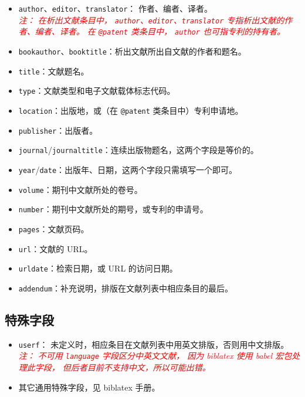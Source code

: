 \documentclass[UTF8, fancyhdr, hyperref]{ctexart}
\newcommand{\myemph}[1]{\emph{\textcolor{red}{#1}}}
\begin{document}
\begin{itemize}
	\item \verb|author|、\verb|editor|、\verb|translator|：
		作者、编者、译者。\\
		\myemph{%
			注：
			在析出文献条目中，
			\texttt{author}、\texttt{editor}、\texttt{translator}
			专指析出文献的作者、编者、译者。
			在 \texttt{@patent} 类条目中，
			\texttt{author} 也可指专利的持有者。%
		}
	\item \verb|bookauthor|、\verb|booktitle|：析出文献所出自文献的作者和题名。
	\item \verb|title|：文献题名。
	\item \verb|type|：文献类型和电子文献载体标志代码\supercite{gbt7714-2005}。
	\item \verb|location|：出版地，或（在 \verb|@patent| 类条目中）专利申请地。
	\item \verb|publisher|：出版者。
	\item \verb|journal|/\verb|journaltitle|：连续出版物题名，这两个字段是等价的。
	\item \verb|year|/\verb|date|：出版年、日期，这两个字段只需填写一个即可。
	\item \verb|volume|：期刊中文献所处的卷号。
	\item \verb|number|：期刊中文献所处的期号，或专利的申请号。
	\item \verb|pages|：文献页码。
	\item \verb|url|：文献的 URL。
	\item \verb|urldate|：检索日期，或 URL 的访问日期。
	\item \verb|addendum|：补充说明，排版在文献列表中相应条目的最后。
\end{itemize}

\subsection{特殊字段}

\begin{itemize}
	\item \verb|userf|：
		未定义时，相应条目在文献列表中用英文排版，否则用中文排版。\\
		\myemph{%
			注：
			不可用 \texttt{language} 字段区分中英文文献，
			因为 biblatex 使用 babel\supercite{babel} 宏包处理此字段，
			但后者目前不支持中文，所以可能出错。%
		}
	\item 其它通用特殊字段，见 biblatex 手册\supercite{biblatex}。
\end{itemize}
\end{document}
